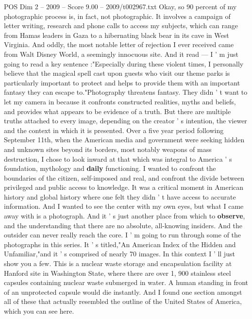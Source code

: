 \begin{textsample}{POS Dim 2 – 2009 – Score 9.00 – 2009/t002967.txt}  \label{ex:f2_pos_091}
Okay, so 90 percent of my photographic process is, in fact, not photographic.
It involves a campaign of letter writing, research and phone calls to access my subjects, which can range from Hamas leaders in Gaza to a hibernating black bear in its cave in West Virginia.
And oddly, the most notable letter of rejection I ever received came from Walt Disney World, a seemingly innocuous site.
And it read — I ' m just going to read a key sentence :"Especially during these violent times, I personally believe that the magical spell cast upon guests who visit our theme parks is particularly important to protect and helps to provide them with an important fantasy they can escape to."Photography threatens fantasy.
They didn ' t want to let my camera in because it confronts constructed realities, myths and beliefs, and provides what appears to be evidence of a truth.
But there are multiple truths attached to every image, depending on the creator ' s intention, the viewer and the context in which it is presented.
Over a five year period following September 11th, when the American media and government were seeking hidden and unknown sites beyond its borders, most notably weapons of mass destruction, I chose to look inward at that which was integral to America ' s foundation, mythology and \textbf{daily} functioning.
I wanted to confront the boundaries of the citizen, self-imposed and real, and confront the divide between privileged and public access to knowledge.
It was a critical moment in American history and global history where one felt they didn ' t have access to accurate information.
And I wanted to see the center with my own eyes, but what I came away with is a photograph.
And it ' s just another place from which to \textbf{observe}, and the understanding that there are no absolute, all-knowing insiders.
And the outsider can never really reach the core.
I ' m going to run through some of the photographs in this series.
It ' s titled,"An American Index of the Hidden and Unfamiliar,"and it ' s comprised of nearly 70 images.
In this context I ' ll just show you a few.
This is a nuclear waste storage and encapsulation facility at Hanford site in Washington State, where there are over 1, 900 stainless steel capsules containing nuclear waste submerged in water.
A human standing in front of an unprotected capsule would die instantly.
And I found one section amongst all of these that actually resembled the outline of the United States of America, which you can see here.

\end{textsample}
